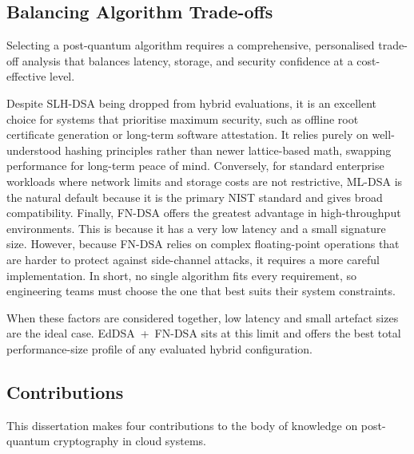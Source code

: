\documentclass[12pt,a4paper]{article}
\begin{document}
\subsection{Balancing Algorithm Trade-offs}
\label{sec:discussion:tradeoffs}

Selecting a post-quantum algorithm requires a comprehensive, personalised trade-off analysis that balances latency, storage, and security confidence at a cost-effective level.

Despite SLH-DSA being dropped from hybrid evaluations, it is an excellent choice for systems that prioritise maximum security, such as offline root certificate generation or long-term software attestation. It relies purely on well-understood hashing principles rather than newer lattice-based math, swapping performance for long-term peace of mind. Conversely, for standard enterprise workloads where network limits and storage costs are not restrictive, ML-DSA is the natural default because it is the primary NIST standard and gives broad compatibility. Finally, FN-DSA offers the greatest advantage in high-throughput environments. This is because it has a very low latency and a small signature size. However, because FN-DSA relies on complex floating-point operations that are harder to protect against side-channel attacks, it requires a more careful implementation. In short, no single algorithm fits every requirement, so engineering teams must choose the one that best suits their system constraints.

When these factors are considered together, low latency and small artefact sizes are the ideal case. EdDSA~+~FN-DSA sits at this limit and offers the best total performance-size profile of any evaluated hybrid configuration.

\subsection{Contributions}
\label{sec:discussion:contributions}

This dissertation makes four contributions to the body of knowledge on post-quantum cryptography in cloud systems.
\end{document}
